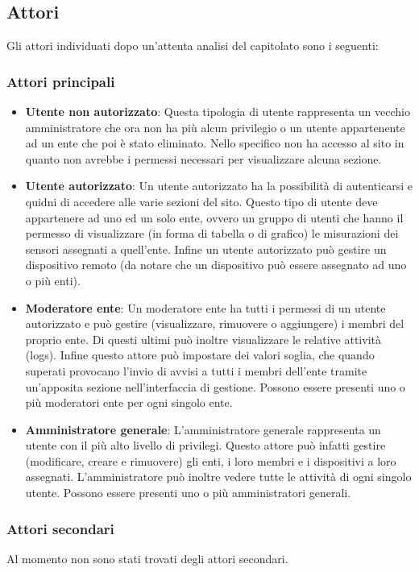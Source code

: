 	\subsection{Attori}
		Gli attori individuati dopo un'attenta analisi del capitolato sono i seguenti:
		\subsubsection{Attori principali}
		\begin{itemize}
			\item \textbf{Utente non autorizzato}: Questa tipologia di utente rappresenta un 
			vecchio amministratore che ora non ha più alcun privilegio o un utente appartenente ad un ente che poi è stato eliminato. Nello specifico non ha accesso al sito in quanto non avrebbe i permessi necessari per visualizzare alcuna sezione.

			\item \textbf{Utente autorizzato}: Un utente autorizzato ha la possibilità di autenticarsi e quidni di accedere alle varie sezioni del sito. Questo tipo di utente deve appartenere ad uno ed un solo ente, ovvero un gruppo di utenti che hanno il permesso di visualizzare (in forma di tabella o di grafico) le misurazioni dei sensori assegnati a quell'ente.
			Infine un utente autorizzato può gestire un dispositivo remoto (da notare che un dispositivo può essere assegnato ad uno o più enti).

			\item \textbf{Moderatore ente}: Un moderatore ente ha tutti i permessi di un utente autorizzato e può gestire (visualizzare, rimuovere o aggiungere) i membri del proprio ente. Di questi ultimi può inoltre visualizzare le relative attività (logs).
			Infine questo attore può impostare dei valori soglia, che quando superati provocano l'invio di avvisi a tutti i membri dell'ente tramite un'apposita sezione nell'interfaccia di gestione. 
			Possono essere presenti uno o più moderatori ente per ogni singolo ente.

			\item \textbf{Amministratore generale}: L'amministratore generale rappresenta un utente con il più alto livello di privilegi. Questo attore può infatti gestire (modificare, creare e rimuovere) gli enti, i loro membri e i dispositivi a loro assegnati.
			L'amministratore può inoltre vedere tutte le attività di ogni singolo utente.
			Possono essere presenti uno o più amministratori generali.
		\end{itemize}
		\subsubsection{Attori secondari}
			Al momento non sono stati trovati degli attori secondari.

	